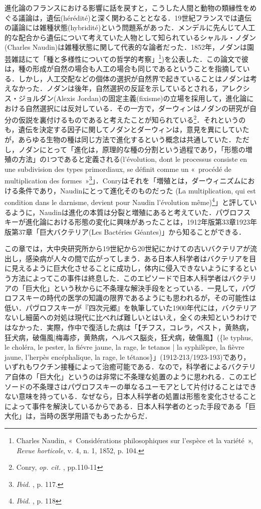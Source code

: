 進化論のフランスにおける影響に話を戻すと，こうした人間と動物の類縁性をめぐる議論は，遺伝(hérédité)と深く関わることとなる．19世紀フランスでは遺伝の議論には雑種状態(hybridité)という問題系があった．メンデルに先んじて人工的な配合から遺伝について考えていた人物として知られているシャルル・ノダン(Charles Naudin)は雑種状態に関して代表的な論者だった．1852年，ノダンは園芸雑誌にて「種と多様性についての哲学的考察」\footnote{Charles Naudin, «~Considérations philosophiques sur l'espèce et la variété~», \emph{Revue horticole}, v. 4, n. 1, 1852, p. 104.})を公表した．この論文で彼は，種の形成が自然の場合も人工の場合も同じであるということを指摘している．しかし，人工交配などの個体の選択が自然界で起きていることはノダンは考えなかった．ノダンは後年，自然選択の反証を示しているとされる，アレクシス・ジョルダン(Alexis Jordan)の固定主義(fixisme)の立場を採用して，進化論における自然選択には反対している．その一方で，ダーウィンはノダンの研究が自分の仮説を裏付けるものであると考えたことが知られている\footnote{Conry, \emph{op. cit. }, pp.110-11}．それというのも，遺伝を決定する因子に関してノダンとダーウィンは，意見を異にしていたが，あらゆる生物の種は同じ方法で進化するという概念は共通していた．ただし，ノダンにとって「進化は，原理的な種の分割という過程であり，「形態の増殖の方法」の1つであると定義される(l'évolution, dont le processus consiste en une subdivision des types primordiaux, se définit comme un «~procédé de multiplication des formes~»\footnote{\emph{Ibid. }, p. 117.}」．Conryはそれを「増殖とは，ダーウィニズムにおける条件であり，Naudinにとって進化そのものだった (La multiplication, qui est condition dans le darnisme, devient pour Naudin l'évolution même)\footnote{\emph{Ibid. }, p. 118}」と評しているように，Naudinは進化の本質は分裂と増殖にあると考えていた．パヴロフスキーが進化論における形態の変化に興味があったことは，1912年版第33章1923年版第37章「巨大バクテリア(Les Bactéries Géantes)」から知ることができる．

この章では，大中央研究所から19世紀から20世紀にかけての古いバクテリアが流出し，感染病が人々の間で広がってしまう．ある日本人科学者はバクテリアを目に見えるように巨大化させることに成功し，体内に侵入できないようにするという方法によってこの事件は終息した．このエピソードで日本人科学者はバクテリアの「巨大化」という秋からに不条理な解決手段をとっている．一見して，パヴロフスキーの時代の医学の知識の限界であるようにも思われるが，その可能性は低い．パヴロフスキーが『四次元郷』を執筆していた1900年代には，バクテリアないし細菌への対処は現代に比べれば難しいとはいえ，全くの未知というわけではなかった．実際，作中で復活した病は「【チフス，コレラ，ペスト，黄熱病，狂犬病，破傷風|梅毒疹，黄熱病，ヘルペス脳炎，狂犬病，破傷風】(\{le typhus, le choléra, le pester, la fiévre jaune, la rage, le tetanos | la syphilèpre, la fièvre jaune, l'herpès encéphalique, la rage, le tétanos\}」(1912-213/1923-193)であり，いずれもワクチン接種によって治癒可能である．なので，科学者によるバクテリア自体の「巨大化」というのは非常に不条理な処置のように思われる．このエピソードの不条理さはパヴロフスキーの単なるユーモアとして片付けることはできない意味を持っている．なぜなら，日本人科学者の処置は形態を変化させることによって事件を解決しているからである．日本人科学者のとった手段である「巨大化」は，当時の医学用語でもあったからだ．


